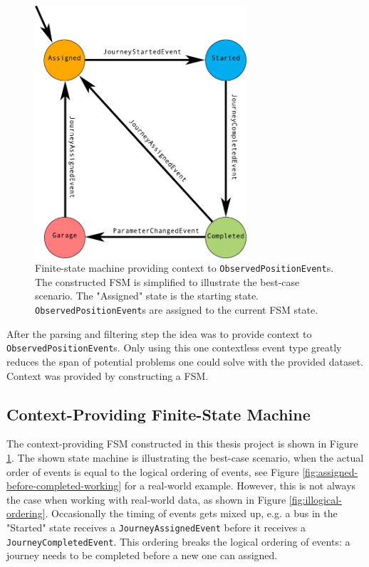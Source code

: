 \begin{figure}[ht!]
    \centering
    \includegraphics[width=0.7\textwidth]{figures/context-state-machine}
    \caption[Finite-state machine providing context to \texttt{ObservedPositionEvent}s]
    {\small Finite-state machine providing context to \texttt{ObservedPositionEvent}s. 
    The constructed FSM is simplified to illustrate the best-case scenario.
    The "Assigned" state is the starting state.
    \texttt{ObservedPositionEvent}s are assigned to the current FSM state.
    }
    \label{fig:context-state-machine}
\end{figure}

After the parsing and filtering step the idea was to provide context to \texttt{ObservedPositionEvent}s.
Only using this one contextless event type greatly reduces the span of potential problems one could solve with the provided dataset.
Context was provided by constructing a FSM.

\subsection{Context-Providing Finite-State Machine}
The context-providing FSM constructed in this thesis project is shown in Figure \ref{fig:context-state-machine}.
The shown state machine is illustrating the best-case scenario, when the actual order of events is equal to the logical ordering of events, see Figure \ref{fig:assigned-before-completed-working} for a real-world example.
However, this is not always the case when working with real-world data, as shown in Figure \ref{fig:illogical-ordering}.
Occasionally the timing of events gets mixed up, e.g. a bus in the "Started" state receives a \texttt{JourneyAssignedEvent} before it receives a \texttt{JourneyCompletedEvent}.
This ordering breaks the logical ordering of events: a journey needs to be completed before a new one can assigned.

